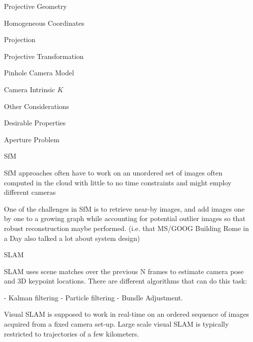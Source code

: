 \begin{section}
\begin{subsubsection}
\begin{subsubsection}
\begin{subsubsection}
\begin{section}{Projective Geometry}
\begin{subsection}{Homogeneous Coordinates}
\begin{subsubsection}
{\begin{subsubsection}{Projection}
\begin{subsubsection}{Projective Transformation}
\begin{subsection}
\begin{subsubsection}
\begin{subsubsection}
\begin{subsubsection}
{\begin{subsubsection}
\begin{subsection}
\begin{subsection} {Pinhole Camera Model}
\begin{subsection} {Camera Intrinsic $K$}
\begin{subsection}
\begin{subsection}
\begin{subsubsection}{Other Considerations}
{\begin{subsection}
\begin{subsubsection}{Desirable Properties}
\begin{section}
\begin{subsection}
\begin{subsection}
\begin{subsection}
\begin{section}
\begin{subsection}
\begin{subsubsection}
\begin{subsubsection}
\begin{subsection}
\begin{section}
\begin{subsection}
\begin{subsubsection}{Aperture Problem}
\begin{subsubsection}
{\begin{section}
\begin{subsubsection}
\begin{subsubsection}
\begin{subsubsection}
\begin{subsection}
\begin{subsection}
\begin{subsection}
\begin{subsection}
\begin{subsection}
\begin{subsection}
\begin{subsection}
\begin{subsubsection}
{\begin{subsubsection}
{\begin{subsubsection}
\begin{section}
\begin{section} SfM

 SfM approaches often have to work on an unordered set of images often computed in the cloud with little to no time constraints and might employ different cameras

One of the challenges in SfM is to retrieve near-by images, and add images one by one to a growing graph while accounting for potential outlier images so that robust reconstruction maybe performed. (i.e. that MS/GOOG Building  Rome in a Day also talked a lot about system design)

\begin{section} SLAM

SLAM uses scene matches over the previous N frames to estimate camera pose and 3D keypoint locations. There are different algorithms that can do this task:

- Kalman filtering
- Particle filtering
- Bundle Adjustment.

Visual SLAM is supposed to work in real-time on an ordered sequence of images acquired from a fixed camera set-up. Large scale visual SLAM is typically restricted to trajectories of a few kilometers.


\end{section}
\end{section}
\end{section}
\end{subsubsection}}
\end{subsubsection}}
\end{subsubsection}
\end{subsection}
\end{subsection}
\end{subsection}
\end{subsection}
\end{subsection}
\end{subsection}
\end{subsection}
\end{subsubsection}
\end{subsubsection}
\end{subsubsection}
\end{section}}
\end{subsubsection}
\end{subsubsection}
\end{subsection}
\end{section}
\end{subsection}
\end{subsubsection}
\end{subsubsection}
\end{subsection}
\end{section}
\end{subsection}
\end{subsection}
\end{subsection}
\end{section}
\end{subsubsection}
\end{subsection}}
\end{subsubsection}
\end{subsection}
\end{subsection}
\end{subsection}
\end{subsection}
\end{subsection}
\end{subsubsection}}
\end{subsubsection}
\end{subsubsection}
\end{subsubsection}
\end{subsection}
\end{subsubsection}
\end{subsubsection}}
\end{subsubsection}
\end{subsection}
\end{section}
\end{subsubsection}
\end{subsubsection}
\end{subsubsection}
\end{section}
